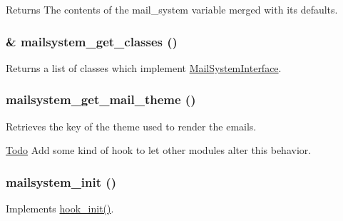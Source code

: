 \begin{DoxyReturn}{Returns}
The contents of the mail\_\-system variable merged with its defaults. 
\end{DoxyReturn}
\hypertarget{mailsystem_8module_aa0df7ed89cbad0a84bc5da2b5d8f551a}{
\subsubsection[{mailsystem\_\-get\_\-classes}]{\setlength{\rightskip}{0pt plus 5cm}\& mailsystem\_\-get\_\-classes ()}}
\label{mailsystem_8module_aa0df7ed89cbad0a84bc5da2b5d8f551a}
Returns a list of classes which implement \hyperlink{interfaceMailSystemInterface}{MailSystemInterface}. \hypertarget{mailsystem_8module_af55c024d345c05de91cddc64ca83b7f7}{
\subsubsection[{mailsystem\_\-get\_\-mail\_\-theme}]{\setlength{\rightskip}{0pt plus 5cm}mailsystem\_\-get\_\-mail\_\-theme ()}}
\label{mailsystem_8module_af55c024d345c05de91cddc64ca83b7f7}
Retrieves the key of the theme used to render the emails.

\begin{Desc}
\item[\hyperlink{todo__todo000067}{Todo}]Add some kind of hook to let other modules alter this behavior. \end{Desc}
\hypertarget{mailsystem_8module_afbcc929c2d7814467338374507f0688f}{
\subsubsection[{mailsystem\_\-init}]{\setlength{\rightskip}{0pt plus 5cm}mailsystem\_\-init ()}}
\label{mailsystem_8module_afbcc929c2d7814467338374507f0688f}
Implements \hyperlink{group__hooks_ga74edef0c463436fdbb1f92ef367db051}{hook\_\-init()}.

